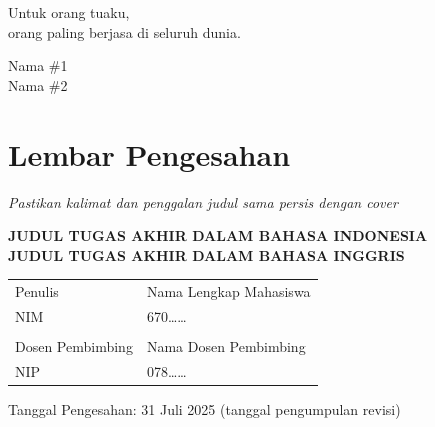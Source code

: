 \documentclass[a4paper,11pt,oneside]{report}
\begin{document}
\begin{center}
    Untuk orang tuaku,\\
    orang paling berjasa di seluruh dunia.
\end{center}

\vspace{3cm}
\begin{flushleft}
    Nama \#1\\
    Nama \#2
\end{flushleft}

\chapter*{Lembar Pengesahan}

\noindent\textit{Pastikan kalimat dan penggalan judul sama persis dengan cover}

\begin{center}
    {\bfseries JUDUL TUGAS AKHIR DALAM BAHASA INDONESIA}\\[6pt]
    {\bfseries JUDUL TUGAS AKHIR DALAM BAHASA INGGRIS}
\end{center}

\vspace{1cm}
\begin{table}[h]
    \centering
    \begin{tabular}{p{4cm}p{8cm}}
        Penulis                 & Nama Lengkap Mahasiswa \\
        NIM                     & 670\ldots\ldots \\
        \multicolumn{2}{c}{} \\
        Dosen Pembimbing        & Nama Dosen Pembimbing \\
        NIP                     & 078\ldots\ldots \\
    \end{tabular}
\end{table}

\vspace{2cm}
\begin{center}
    Tanggal Pengesahan: 31 Juli 2025 (tanggal pengumpulan revisi)
\end{center}

\end{document}
